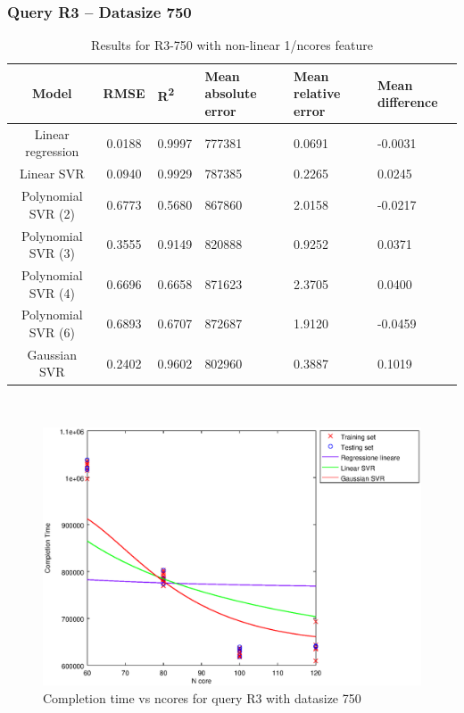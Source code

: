 \documentclass[a4paper,11pt]{article}
\begin{document}
\newpage
\subsubsection{Query R3 -- Datasize 750}
\begin{table}[H]
	\centering
	\begin{adjustbox}{center}
		\begin{tabular}{c | c M{1.2cm} M{2.5cm} M{2.5cm} M{1.8cm}}
			Model & RMSE & R\textsuperscript{2} & Mean absolute error & Mean relative error & Mean difference \tabularnewline
			\hline
			Linear regression & 0.0188 & 0.9997 & 777381 & 0.0691 & -0.0031 \\
			Linear SVR & 0.0940 & 0.9929 & 787385 & 0.2265 & 0.0245 \\
			Polynomial SVR (2) & 0.6773 & 0.5680 & 867860 & 2.0158 & -0.0217 \\
			Polynomial SVR (3) & 0.3555 & 0.9149 & 820888 & 0.9252 & 0.0371 \\
			Polynomial SVR (4) & 0.6696 & 0.6658 & 871623 & 2.3705 & 0.0400 \\
			Polynomial SVR (6) & 0.6893 & 0.6707 & 872687 & 1.9120 & -0.0459 \\
			Gaussian SVR & 0.2402 & 0.9602 & 802960 & 0.3887 & 0.1019 \\
		\end{tabular}
	\end{adjustbox}
	\\
	\caption{Results for R3-750 with non-linear 1/ncores feature}
	\label{table_R3_prediction_all}
\end{table}

\begin {figure}[hbtp]
\centering
\includegraphics[width=\textwidth]{output/R3_750_1_OVER_NCORES/plot_R3_750_bestmodels.eps}
\caption {Completion time vs ncores for query R3 with datasize 750}
\end {figure}
\end{document}
